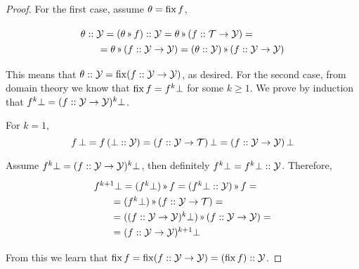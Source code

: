 \begin{proof}

 For the first case, assume $\theta=\operatorname{fix} f$,

\[\renewcommand\arraystretch{1.3}
  \begin{array}{l}
   \theta::\Y = (\theta\applt f)::\Y = \theta\applt(f::\T\to\Y) = \\
   \qquad=\theta\applt(f::\Y\to\Y) = (\theta::\Y)\applt(f::\Y\to\Y)
 \end{array}\]

This means that $\theta::\mathcal{Y} = \operatorname{fix}(f::\mathcal{Y}\to\mathcal{Y})$, as desired.
For the second case, from domain theory we know that $\operatorname{fix} f = f^k\bot$ for some $k\geq 1$.
We prove by induction that $f^k\bot = (f :: \mathcal{Y}\to\mathcal{Y})^k\bot$.

For $k=1$, \[f\,\bot = f\,(\bot :: \mathcal{Y}) = (f :: \mathcal{Y}\to\mathcal{T})\,\bot = (f :: \mathcal{Y}\to\mathcal{Y})\,\bot\]

Assume $f^k\bot = (f :: \mathcal{Y}\to\mathcal{Y})^k\bot$, then definitely $f^k\bot = f^k\bot :: \mathcal{Y}$.
Therefore, 
\[\renewcommand\arraystretch{1.3}
  \begin{array}{l}
    f^{k+1}\bot = (f^k\bot)\applt f = (f^k\bot::\Y)\applt f = \\
    \qquad = (f^k\bot)\applt(f::\Y\to\T) = \\
    \qquad = ((f :: \Y\to\Y)^k\bot) \applt (f::\Y\to\Y) = \\
    \qquad = (f::\Y\to\Y)^{k+1}\bot
  \end{array}
\]

From this we learn that $\operatorname{fix} f = \operatorname{fix}(f :: \mathcal{Y}\to\mathcal{Y}) = (\operatorname{fix} f) :: \mathcal{Y}$.
\end{proof}

